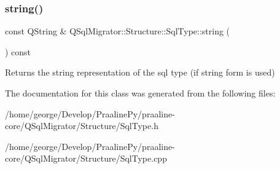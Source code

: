 \subsubsection{\texorpdfstring{string()}{string()}}
{\footnotesize\ttfamily const Q\+String \& Q\+Sql\+Migrator\+::\+Structure\+::\+Sql\+Type\+::string (\begin{DoxyParamCaption}{ }\end{DoxyParamCaption}) const}

\begin{DoxyReturn}{Returns}
the string representation of the sql type (if string form is used) 
\end{DoxyReturn}


The documentation for this class was generated from the following files\+:\begin{DoxyCompactItemize}
\item 
/home/george/\+Develop/\+Praaline\+Py/praaline-\/core/\+Q\+Sql\+Migrator/\+Structure/Sql\+Type.\+h\item 
/home/george/\+Develop/\+Praaline\+Py/praaline-\/core/\+Q\+Sql\+Migrator/\+Structure/Sql\+Type.\+cpp\end{DoxyCompactItemize}

